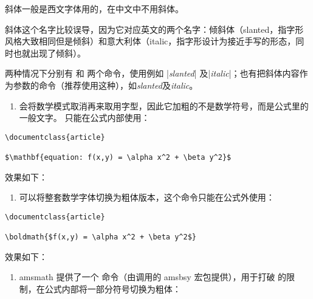 






斜体一般是西文字体用的，在中文中不用斜体。

斜体这个名字比较误导，因为它对应英文的两个名字：倾斜体（slanted，指字形风格大致相同但是倾斜）和意大利体（italic，指字形设计为接近手写的形态，同时也就出现了倾斜）。

两种情况下分别有  和  两个命令，使用例如
|{\slshape slanted}| 及|{\itshape italic}|；也有把斜体内容作为参数的命令（推荐使用这种），如\textsl{slanted}及\textit{italic}。



\begin{enumerate}
\def\labelenumi{\arabic{enumi}.}
\item

  会将数学模式取消再来取用字型，因此它加粗的不是数学符号，而是公式里的一般文字。 只能在公式内部使用：
\end{enumerate}

\begin{verbatim}
\documentclass{article}

$\mathbf{equation: f(x,y) = \alpha x^2 + \beta y^2}$

\end{verbatim}

效果如下：

\begin{enumerate}
\def\labelenumi{\arabic{enumi}.}
\setcounter{enumi}{1}
\item

   可以将整套数学字体切换为粗体版本，这个命令只能在公式外使用：
\end{enumerate}

\begin{verbatim}
\documentclass{article}

\boldmath{$f(x,y) = \alpha x^2 + \beta y^2$}

\end{verbatim}

效果如下：

\begin{enumerate}
\def\labelenumi{\arabic{enumi}.}
\setcounter{enumi}{2}
\item

  amsmath 提供了一个  命令（由调用的 amsbsy
  宏包提供），用于打破 
  的限制，在公式内部将一部分符号切换为粗体：
\end{enumerate}

